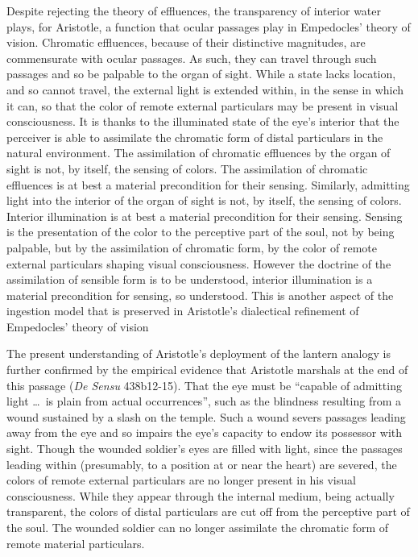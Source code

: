 Despite rejecting the theory of effluences, the transparency of interior water plays, for Aristotle, a function that ocular passages play in Empedocles' theory of vision. Chromatic effluences, because of their distinctive magnitudes, are commensurate with ocular passages. As such, they can travel through such passages and so be palpable to the organ of sight. While a state lacks location, and so cannot travel, the external light is extended within, in the sense in which it can, so that the color of remote external particulars may be present in visual consciousness. It is thanks to the illuminated state of the eye's interior that the perceiver is able to assimilate the chromatic form of distal particulars in the natural environment. The assimilation of chromatic effluences by the organ of sight is not, by itself, the sensing of colors. The assimilation of chromatic effluences is at best a material precondition for their sensing. Similarly, admitting light into the interior of the organ of sight is not, by itself, the sensing of colors. Interior illumination is at best a material precondition for their sensing. Sensing is the presentation of the color to the perceptive part of the soul, not by being palpable, but by the assimilation of chromatic form, by the color of remote external particulars shaping visual consciousness. However the doctrine of the assimilation of sensible form is to be understood, interior illumination is a material precondition for sensing, so understood. This is another aspect of the ingestion model that is preserved in Aristotle's dialectical refinement of Empedocles' theory of vision

The present understanding of Aristotle's deployment of the lantern analogy is further confirmed by the empirical evidence that Aristotle marshals at the end of this passage (\emph{De Sensu} 438b12-15). That the eye must be ``capable of admitting light \ldots\ is plain from actual occurrences'', such as the blindness resulting from a wound sustained by a slash on the temple. Such a wound severs passages leading away from the eye and so impairs the eye's capacity to endow its possessor with sight. Though the wounded soldier's eyes are filled with light, since the passages leading within (presumably, to a position at or near the heart) are severed, the colors of remote external particulars are no longer present in his visual consciousness. While they appear through the internal medium, being actually transparent, the colors of distal particulars are cut off from the perceptive part of the soul. The wounded soldier can no longer assimilate the chromatic form of remote material particulars.

